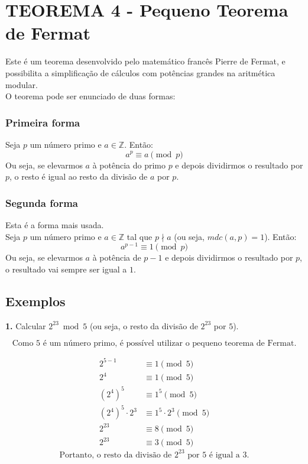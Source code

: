 \section*{TEOREMA 4 - Pequeno Teorema de Fermat}
Este é um teorema desenvolvido pelo matemático francês Pierre de Fermat, e possibilita a simplificação de cálculos com potências grandes na aritmética modular.\\
O teorema pode ser enunciado de duas formas:

\subsubsection*{Primeira forma}
Seja $p$ um número primo e $a \in \mathbb{Z}$. Então:
\[
    a^p \equiv a \pmod{p}
\]
Ou seja, se elevarmos $a$ à potência do primo $p$ e depois dividirmos o resultado por $p$, o resto é igual ao resto da divisão de $a$ por $p$.

\subsubsection*{Segunda forma}
Esta é a forma mais usada.\\
Seja $p$ um número primo e $a \in \mathbb{Z}$ tal que $p \nmid a$ (ou seja, $mdc(a,p) = 1$). Então:
\[
    a^{p-1} \equiv 1 \pmod {p}
\]
Ou seja, se elevarmos $a$ à potência de $p-1$ e depois dividirmos o resultado por $p$, o resultado vai sempre ser igual a $1$.

\subsection*{Exemplos}
\textbf{1.} Calcular $2^{23} \bmod 5$ (ou seja, o resto da divisão de $2^{23}$ por $5$).

\[
    \text{Como 5 é um número primo, é possível utilizar o pequeno teorema de Fermat.}
\]

\setcounter{equation}{0}
\begin{align}
    2^{5-1}                 & \equiv 1 \pmod{5}                 \\
    2^{4}                   & \equiv 1 \pmod {5}                \\
    (2^{4})^{5}             & \equiv 1^{5} \pmod {5}            \\
    (2^{4})^{5} \cdot 2^{3} & \equiv 1^{5} \cdot 2^{3} \pmod{5} \\
    2^{23}                  & \equiv 8 \pmod{5}                 \\
    2^{23}                  & \equiv 3 \pmod {5}
\end{align}
\[
    \text{Portanto, o resto da divisão de $2^{23}$ por 5 é igual a 3.}
\]